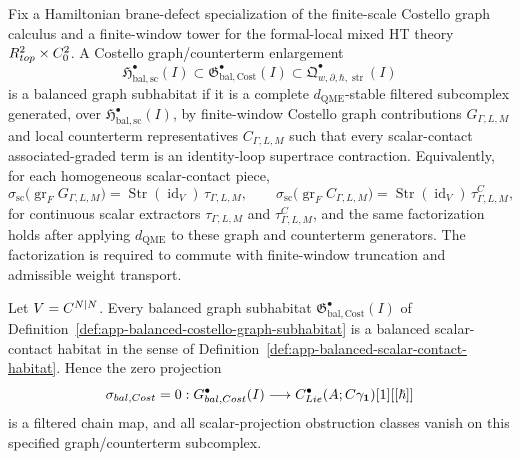 \begin{defn}
\label{def:app-balanced-costello-graph-subhabitat}
  Fix a Hamiltonian brane-defect specialization of the finite-scale
  Costello graph calculus and a finite-window tower for the formal-local
  mixed HT theory
  \(R^2_{top}\times C^2_0\).  A Costello
  graph/counterterm enlargement
  \[
    \mathfrak H^\bullet_{\mathrm{bal,sc}}(I)
      \subset
    \mathfrak G^\bullet_{\mathrm{bal,Cost}}(I)
      \subset
    \mathfrak Q^\bullet_{w,\partial,\hbar,\operatorname{str}}(I)
  \]
  is a balanced graph subhabitat if it is a complete
  \(d_{\mathrm{QME}}\)-stable filtered subcomplex generated, over
  \(\mathfrak H^\bullet_{\mathrm{bal,sc}}(I)\), by finite-window
  Costello graph contributions \(G_{\Gamma,L,M}\) and local counterterm
  representatives \(C_{\Gamma,L,M}\) such that every scalar-contact
  associated-graded term is an identity-loop supertrace contraction.
  Equivalently, for each homogeneous scalar-contact piece,
  \[
    \sigma_{\mathrm{sc}}\bigl(\operatorname{gr}_{F}G_{\Gamma,L,M}\bigr)
      =
    \operatorname{Str}(\operatorname{id}_V)\,\tau_{\Gamma,L,M},
    \qquad
    \sigma_{\mathrm{sc}}\bigl(\operatorname{gr}_{F}C_{\Gamma,L,M}\bigr)
      =
    \operatorname{Str}(\operatorname{id}_V)\,\tau^C_{\Gamma,L,M},
  \]
  for continuous scalar extractors \(\tau_{\Gamma,L,M}\) and
  \(\tau^C_{\Gamma,L,M}\), and the same factorization holds after
  applying \(d_{\mathrm{QME}}\) to these graph and counterterm
  generators.  The factorization is required to commute with
  finite-window truncation and admissible weight transport.
\end{defn}

\begin{prop}
\label{prop:app-balanced-costello-graph-preservation}
  Let \(V=C^{N|N}\).  Every balanced graph subhabitat
  \(\mathfrak G^\bullet_{\mathrm{bal,Cost}}(I)\) of
  Definition~\ref{def:app-balanced-costello-graph-subhabitat} is a
  balanced scalar-contact habitat in the sense of
  Definition~\ref{def:app-balanced-scalar-contact-habitat}.  Hence the
  zero projection
  \[
    \sigma_{bal,Cost}=0:
    G^\bullet_{bal,Cost}(I)
      \longrightarrow
    C^\bullet_{Lie}(A;C\gamma_{\mathbf 1})[1][[\hbar]]
  \]
  is a filtered chain map, and all scalar-projection obstruction classes
  vanish on this specified graph/counterterm subcomplex.
\end{prop}

